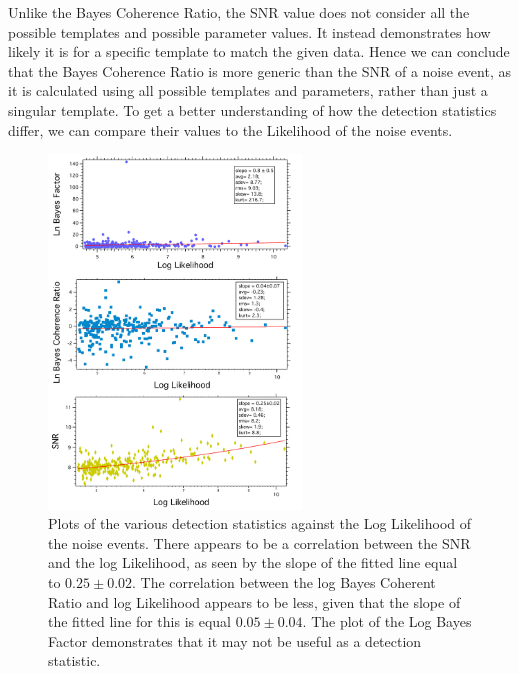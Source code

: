 \documentclass{article}
\begin{document}
 
 Unlike the Bayes Coherence Ratio, the SNR value does not consider all the possible templates and possible parameter values. It instead demonstrates how likely it is for a specific template to match the given data. Hence we can conclude that the Bayes Coherence Ratio is more generic than the SNR of a noise event, as it is calculated using all possible templates and parameters, rather than just a singular template. To get a better understanding of how the detection statistics differ, we can compare their values to the Likelihood of the noise events.\\
       
       
       \begin{figure}[h]
       	\centering
       	\includegraphics[width=0.6\textwidth]{Figures/DetectionStatisticComparison.pdf} 
       	\caption{Plots of the various detection statistics against the Log Likelihood of the noise events. There appears to be a correlation between the SNR and the log Likelihood, as seen by the slope of the fitted line equal to $0.25\pm0.02$. The correlation between the log Bayes Coherent Ratio and log Likelihood appears to be less, given that the slope of the fitted line for this is equal $0.05\pm0.04$. The plot of the Log Bayes Factor demonstrates that it may not be useful as a detection statistic.}
       	\label{Fig:SeparateDetectionStatisticVSlnL}
       \end{figure}
                
                
                
\end{document}
